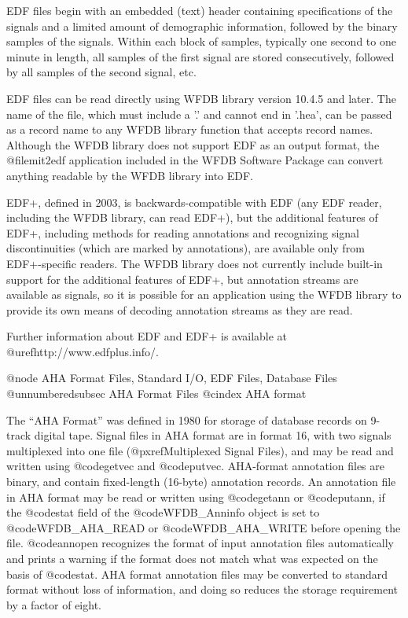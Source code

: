 {{{{{{{{{EDF files begin with an embedded (text) header containing specifications of the
signals and a limited amount of demographic information, followed by the binary
samples of the signals.  Within each block of samples, typically one second to
one minute in length, all samples of the first signal are stored consecutively,
followed by all samples of the second signal, etc.

EDF files can be read directly using WFDB library version 10.4.5 and later.
The name of the file, which must include a '.' and cannot end in '.hea', can
be passed as a record name to any WFDB library function that accepts record
names.  Although the WFDB library does not support EDF as an output format, the
@file{mit2edf} application included in the WFDB Software Package can convert
anything readable by the WFDB library into EDF.

EDF+, defined in 2003, is backwards-compatible with EDF (any EDF reader,
including the WFDB library, can read EDF+), but the additional features of
EDF+, including methods for reading annotations and recognizing signal
discontinuities (which are marked by annotations), are available only from
EDF+-specific readers.  The WFDB library does not currently include built-in
support for the additional features of EDF+, but annotation streams are
available as signals, so it is possible for an application using the WFDB
library to provide its own means of decoding annotation streams as they are
read.

Further information about EDF and EDF+ is available at
@uref{http://www.edfplus.info/}.

@node     AHA Format Files, Standard I/O, EDF Files, Database Files
@unnumberedsubsec AHA Format Files
@cindex AHA format

The ``AHA Format'' was defined in 1980 for storage of database records
on 9-track digital tape.  Signal files in AHA format are in format 16,
with two signals multiplexed into one file (@pxref{Multiplexed Signal Files}),
and may be read and written using @code{getvec} and @code{putvec}.
AHA-format annotation files are binary, and contain fixed-length
(16-byte) annotation records.  An annotation file in AHA format may be
read or written using @code{getann} or @code{putann}, if the @code{stat}
field of the @code{WFDB_Anninfo} object is set to @code{WFDB_AHA_READ} or
@code{WFDB_AHA_WRITE} before opening the file.  @code{annopen} recognizes the
format of input annotation files automatically and prints a warning if
the format does not match what was expected on the basis of @code{stat}.
AHA format annotation files may be converted to standard format without
loss of information, and doing so reduces the storage requirement by a
factor of eight.

}}}}}}}}}
